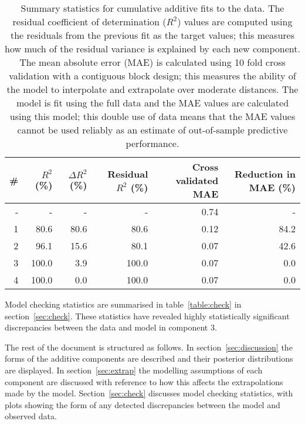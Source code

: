 \documentclass{article} %
\begin{document}
\begin{table}[htb]
\begin{center}
{\small
\begin{tabular}{|r|rrrrr|}
\hline
\bf{\#} & {$R^2$ (\%)} & {$\Delta R^2$ (\%)} & {Residual $R^2$ (\%)} & {Cross validated MAE} & Reduction in MAE (\%)\\
\hline
- & - & - & - & 0.74 & -\\

1 & 80.6 & 80.6 & 80.6 & 0.12 & 84.2\\

2 & 96.1 & 15.6 & 80.1 & 0.07 & 42.6\\

3 & 100.0 & 3.9 & 100.0 & 0.07 & 0.0\\

4 & 100.0 & 0.0 & 100.0 & 0.07 & 0.0\\

\hline
\end{tabular}
\caption{
Summary statistics for cumulative additive fits to the data.
The residual coefficient of determination ($R^2$) values are computed using the residuals from the previous fit as the target values; this measures how much of the residual variance is explained by each new component.
The mean absolute error (MAE) is calculated using 10 fold cross validation with a contiguous block design; this measures the ability of the model to interpolate and extrapolate over moderate distances.
The model is fit using the full data and the MAE values are calculated using this model; this double use of data means that the MAE values cannot be used reliably as an estimate of out-of-sample predictive performance.
}
\label{table:stats}
}
\end{center}
\end{table}

Model checking statistics are summarised in table~\ref{table:check} in section~\ref{sec:check}.
These statistics have revealed highly statistically significant discrepancies between the data and model in component 3.

The rest of the document is structured as follows.
In section~\ref{sec:discussion} the forms of the additive components are described and their posterior distributions are displayed.
In section~\ref{sec:extrap} the modelling assumptions of each component are discussed with reference to how this affects the extrapolations made by the model.
Section~\ref{sec:check} discusses model checking statistics, with plots showing the form of any detected discrepancies between the model and observed data.
\end{document}
